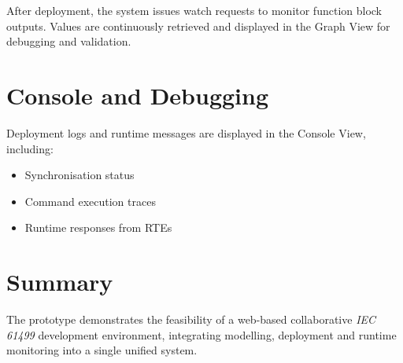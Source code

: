 After deployment, the system issues watch requests to monitor function block outputs. Values are continuously retrieved and displayed in the Graph View for debugging and validation.

\section{Console and Debugging}

Deployment logs and runtime messages are displayed in the Console View, including:
\begin{itemize}
    \item Synchronisation status
    \item Command execution traces
    \item Runtime responses from \acp{RTE}
\end{itemize}

\section{Summary}

The prototype demonstrates the feasibility of a web-based collaborative \textit{IEC 61499} development environment, integrating modelling, deployment and runtime monitoring into a single unified system.
